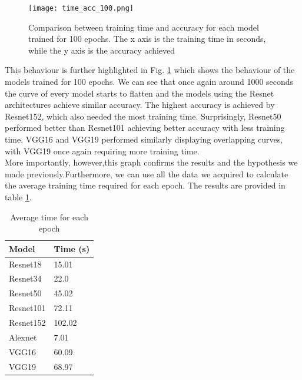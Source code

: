 \begin{figure}[h]
       \centering 
	    \texttt{[image: time\_acc\_100.png]}
        \caption[Comparison between training time and accuracy for each model for 100 epochs]{Comparison between training time and accuracy for each model trained for 100 epochs. The x axis is the training time in seconds, while the y axis is the accuracy achieved}
         \label{fig:time_acc_100}
\end{figure}




This behaviour is further highlighted in Fig. \ref{fig:time_acc_100} which shows the behaviour of the models trained for 100 epochs. We can see that once again around 1000 seconds the curve of every model starts to flatten and the models using the Resnet architectures achieve similar accuracy. The highest accuracy is achieved by Resnet152, which also needed the most training time. Surprisingly, Resnet50 performed better than Resnet101 achieving better accuracy with less training time.
VGG16 and VGG19 performed similarly displaying overlapping curves, with VGG19 once again requiring more training time. \\
More importantly, however,this graph confirms the results and the hypothesis we made previously.Furthermore, we can use all the data we acquired to calculate the average training time required for each epoch. The results are provided in table \ref{tab:time_f_epoch}.
\begin{table}[h]
\centering
\begin{tabular}{ p{2cm} p{2cm}   }
 Model&Time (s)\\
 \hline
Resnet18&15.01\\
Resnet34&22.0\\
Resnet50&45.02\\
Resnet101&72.11\\
Resnet152&102.02\\
Alexnet&7.01\\
VGG16&60.09\\
VGG19&68.97\\
 \hline
\end{tabular}
\caption{Average time for each epoch}
\label{tab:time_f_epoch}
\end{table}

